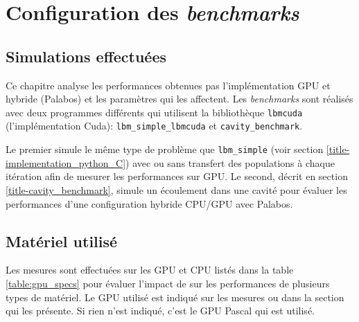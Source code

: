 \section{Configuration des \textit{benchmarks}}
\subsection{Simulations effectuées}
Ce chapitre analyse les performances obtenues pas l'implémentation \acs{GPU} et hybride (Palabos) et les paramètres qui les affectent. Les \textit{benchmarks} sont réalisés avec deux programmes différents qui utilisent la bibliothèque \texttt{lbmcuda} (l'implémentation Cuda): \texttt{lbm\_simple\_lbmcuda} et \texttt{cavity\_benchmark}.

Le premier simule le même type de problème que \texttt{lbm\_simple} (voir section \ref{title-implementation_python_C}) avec ou sans transfert des populations à chaque itération afin de mesurer les performances sur \acs{GPU}. Le second, décrit en section \ref{title-cavity_benchmark}, simule un écoulement dans une cavité pour évaluer les performances d'une configuration hybride \acs{CPU}/\acs{GPU} avec Palabos.  

\subsection{Matériel utilisé}
Les mesures sont effectuées sur les \acs{GPU} et \acs{CPU} listés dans la table \ref{table:gpu_specs} pour évaluer l'impact de sur les performances de plusieurs types de matériel. Le \acs{GPU} utilisé est indiqué sur les mesures ou dans la section qui les présente. Si rien n'est indiqué, c'est le \acs{GPU} Pascal qui est utilisé.

